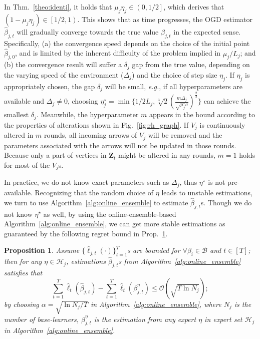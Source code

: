 \documentclass{article}
\theoremstyle{plain}
\newtheorem{proposition}[theorem]{Proposition}
\theoremstyle{definition}
\theoremstyle{remark}
\def \eg {\textit{e.g.}}
\def \Fig {Fig.}
\def \prop {Prop.}
\def \thm {Thm.}
\def \sB {\mathcal{B}}
\def \sH {\mathcal{H}}
\def \Z {\mathbf{Z}}
\begin{document}
In \thm~\ref{theo:identi}, it holds that $\mu_j \eta_j\in\left(0, 1/2\right]$, which derives that $(1-\mu_j \eta_j)\in\left[1/2, 1\right)$. 
This shows that as time progresses, the OGD estimator $\hat{\beta}_{j, t}$ will gradually converge towards the true value $\beta_{j, t}$ in the expected sense. 
Specifically, (a) the convergence speed depends on the choice of the initial point $\hat{\beta}_{j, 0}$, 
and is limited by the inherent difficulty of the problem implied in $\mu_j/L_j$; and
(b) the convergence result will suffer a $\delta_j$ gap from the true value, depending on the varying speed of the environment ($\Delta_j$) and the choice of step size $\eta_j$. 
If $\eta_j$ is appropriately chosen, the gap $\delta_j$ will be small, \eg, if all hyperparameters are available and $\Delta_j\neq 0$, 
choosing $\eta^\star_j = \min\{1/2L_j, \sqrt[3]{2}(\frac{m\Delta_j}{\sqrt{\mu_j}\sigma})^\frac23\}$ can achieve the smallest $\delta_j$.
Meanwhile, the hyperparameter $m$ appears in the bound according to the properties of alterations shown in \Fig~\ref{fig:rh_graph}.
If $V_j$ is continuously altered in $m$ rounds, all incoming arrows of $V_j$ will be removed and the parameters associated with the arrows will not be updated in those rounds.
Because only a part of vertices in $\Z_t$ might be altered in any rounds, $m = 1$ holds for most of the $V_j$s. 

In practice, we do not know exact parameters such as $\Delta_j$, thus $\eta^\star$ is not pre-available. 
Recognizing that the random choice of $\eta$ leads to unstable estimations, we turn to use Algorithm~\ref{alg:online_ensemble} to estimate $\hat{\beta}_{j, t}$s. 
Though we do not know $\eta^\star$ as well, by using the online-ensemble-based Algorithm~\ref{alg:online_ensemble}, we can get more stable estimations as guaranteed by the following regret bound in \prop~\ref{prop:online_ensemble}.

\begin{proposition}
  \label{prop:online_ensemble}
  Assume $\{\hat{\ell}_{j, t}(\cdot)\}_{t=1}^T$s are bounded for $\forall \beta_i\in\sB$ and $t\in [T]$;
  then for any $\eta \in \sH_j$, estimations $\hat{\beta}_{j, t}$s from Algorithm~\ref{alg:online_ensemble} satisfies that
  \vskip -0.15in
  \begin{equation*}
    \sum_{t=1}^T \hat{\ell}_t\left(\hat{\beta}_{j, t}\right)-\sum_{t=1}^T \hat{\ell}_t\left(\beta^\eta_{j, t}\right) \leq \mathcal{O}\left(\sqrt{T\ln N_j}\right);
  \end{equation*}
  \vskip -0.1in
  by choosing $\alpha=\sqrt{\ln N_j/T}$ in Algorithm~\ref{alg:online_ensemble}, where $N_j$ is the number of base-learners, $\beta^\eta_{j, t}$ is the estimation from any expert $\eta$ in expert set $\sH_j$ in Algorithm~\ref{alg:online_ensemble}.
\end{proposition}
\vskip -0.05in
\end{document}
